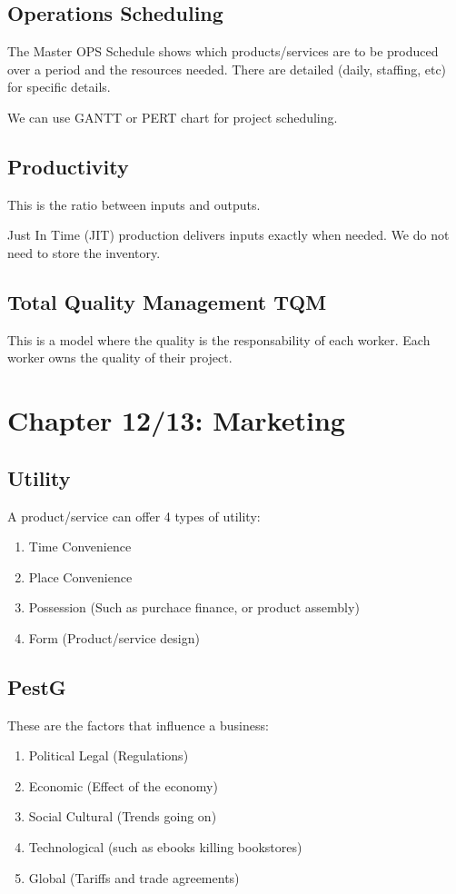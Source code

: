\documentclass[12pt,letterpaper]{article} \usepackage{amsmath} \usepackage{graphicx} \usepackage[margin=1in]{geometry} \usepackage{longtable}  \usepackage{amssymb}
\begin{document}
		\subsection{Operations Scheduling}
		The Master OPS Schedule shows which products/services are to be produced over a period and the resources needed. There are detailed (daily, staffing, etc) for specific details. 
		
		We can use GANTT or PERT chart for project scheduling.
		
		\subsection{Productivity}
		This is the ratio between inputs and outputs. 
		
		Just In Time (JIT) production delivers inputs exactly when needed. We do not need to store the inventory.  
		
		\subsection{Total Quality Management TQM}
		This is a model where the quality is the responsability of each worker. Each worker owns the quality of their project. 
		
		\section{Chapter 12/13: Marketing}
		\subsection{Utility} 
		A product/service can offer 4 types of utility:
		\begin{enumerate}[noitemsep]
			\item Time Convenience
			\item Place Convenience
			\item Possession (Such as purchace finance, or product assembly)
			\item Form (Product/service design)
		\end{enumerate}
	
		\subsection{PestG}
		These are the factors that influence a business:
		\begin{enumerate}[noitemsep]
			\item Political Legal (Regulations)
			\item Economic (Effect of the economy)
			\item Social Cultural (Trends going on)
			\item Technological (such as ebooks killing bookstores)
			\item Global (Tariffs and trade agreements)
		\end{enumerate}
	
\end{document}
